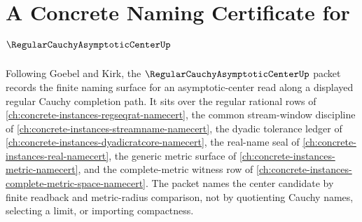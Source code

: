 \chapter{A Concrete Naming Certificate for $\RegularCauchyAsymptoticCenterUp$}
\label{ch:concrete-instances-regular-cauchy-asymptotic-center-namecert}

Following Goebel and Kirk, the $\RegularCauchyAsymptoticCenterUp$ packet records the finite naming surface for an asymptotic-center read along a displayed regular Cauchy completion path. It sits over the regular rational rows of \autoref{ch:concrete-instances-regseqrat-namecert}, the common stream-window discipline of \autoref{ch:concrete-instances-streamname-namecert}, the dyadic tolerance ledger of \autoref{ch:concrete-instances-dyadicratcore-namecert}, the real-name seal of \autoref{ch:concrete-instances-real-namecert}, the generic metric surface of \autoref{ch:concrete-instances-metric-namecert}, and the complete-metric witness row of \autoref{ch:concrete-instances-complete-metric-space-namecert}. The packet names the center candidate by finite readback and metric-radius comparison, not by quotienting Cauchy names, selecting a limit, or importing compactness.

